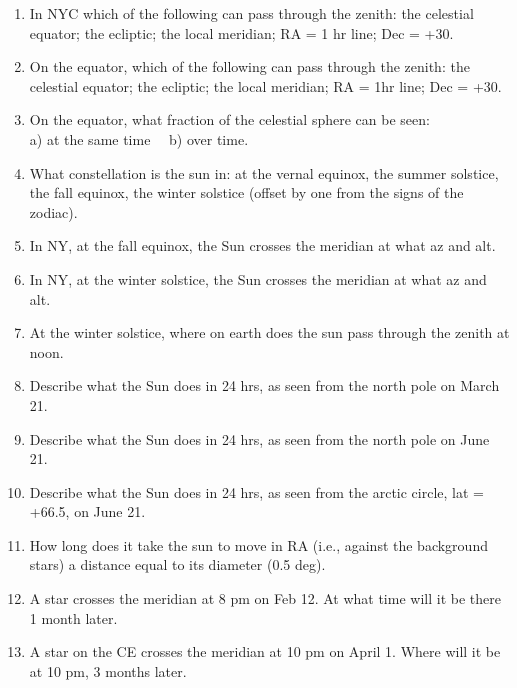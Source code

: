 \begin{enumerate} 

\item 
In NYC which of the following can pass through the zenith:
the celestial equator; the ecliptic; the local meridian; RA = 1 hr
line; Dec = +30\deg.

\item On the equator, which of the following can pass
through the zenith: the celestial equator; the ecliptic;
the local meridian; RA = 1hr line; Dec = +30\deg.

\item
On the equator, what fraction of the celestial sphere can be seen:\\
a) at the same time  \ \  b) over time.

\item
What constellation is the sun in: at the vernal equinox, the summer
solstice, the fall equinox, the winter solstice (offset by one from
the signs of the zodiac).

\item
In NY, at the fall equinox, the Sun crosses the meridian at what
az and alt.

\item
In NY, at the winter solstice, the Sun crosses the meridian at what
az and alt.

\item
At the winter solstice, where on earth does the sun pass through the
zenith at noon.

\item
Describe what the Sun does in 24 hrs, as seen from the north pole on
March 21.

\item
Describe what the Sun does in 24 hrs, as seen from the north pole on
June 21.

\item
Describe what the Sun does in 24 hrs, as seen from the arctic circle,
lat = +66.5\deg, on June 21.

\item
How long does it take the sun to move in RA 
(i.e., against the background stars) a distance equal to its
diameter (0.5 deg).

\item A star crosses the meridian at 8 pm on Feb 12. At what time will
  it be there 1 month later. 

\item A star on the CE crosses the meridian at 10 pm on April 1. Where
  will it be at 10 pm,  3 months later. 


\end{enumerate}
